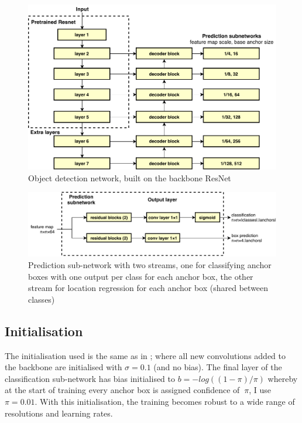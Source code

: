 \begin{figure}[h]
  \centering
  \includegraphics[width=1.0\linewidth]{figures/annotation/detection_network.pdf}
  \caption{Object detection network, built on the backbone ResNet }  
  \label{fig:detection_network}
\end{figure}

\begin{figure}
  \centering
  \includegraphics[width=1.0\linewidth]{figures/annotation/prediction_subnet.pdf}
  \caption{Prediction sub-network with two streams, one for classifying anchor boxes with one output per class for each anchor box, the other stream for location regression for each anchor box (shared between classes)}    
  \label{fig:prediction_subnet}  
\end{figure}

\subsection{Initialisation}

The initialisation used is the same as in \cite{Lin2017}; where all new convolutions added to the backbone are initialised with $\sigma=0.1$ (and no bias). The final layer of the classification sub-network has bias initialised to $b = −log((1 − \pi)/\pi) $ whereby at the start of training every anchor box is assigned confidence of $~\pi$, I use $\pi=0.01$. With this initialisation, the training becomes robust to a wide range of resolutions and learning rates.

